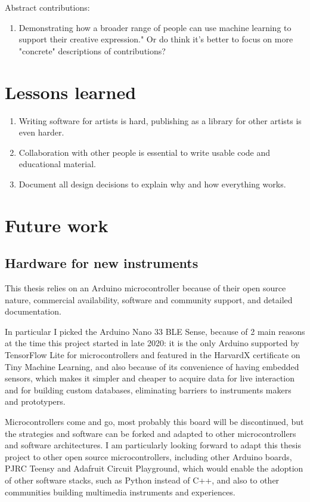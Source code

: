 Abstract contributions:

\begin{enumerate}
 \item Demonstrating how a broader range of people can use machine learning to support their creative expression." Or do think it's better to focus on more "concrete" descriptions of contributions?
\end{enumerate}

\section{Lessons learned}

\begin{enumerate}
  \item Writing software for artists is hard, publishing as a library for other artists is even harder.
  \item Collaboration with other people is essential to write usable code and educational material.
  \item Document all design decisions to explain why and how everything works.
\end{enumerate}

\section{Future work}

\subsection{Hardware for new instruments}

This thesis relies on an Arduino microcontroller because of their open source nature, commercial availability, software and community support, and detailed documentation.

In particular I picked the Arduino Nano 33 BLE Sense, because of 2 main reasons at the time this project started in late 2020: it is the only Arduino supported by TensorFlow Lite for microcontrollers and featured in the HarvardX certificate on Tiny Machine Learning, and also because of its convenience of having embedded sensors, which makes it simpler and cheaper to acquire data for live interaction and for building custom databases, eliminating barriers to instruments makers and prototypers.

Microcontrollers come and go, most probably this board will be discontinued, but the strategies and software can be forked and adapted to other microcontrollers and software architectures. I am particularly looking forward to adapt this thesis project to other open source microcontrollers, including other Arduino boards, PJRC Teensy and Adafruit Circuit Playground, which would enable the adoption of other software stacks, such as Python instead of C++, and also to other communities building multimedia instruments and experiences.

